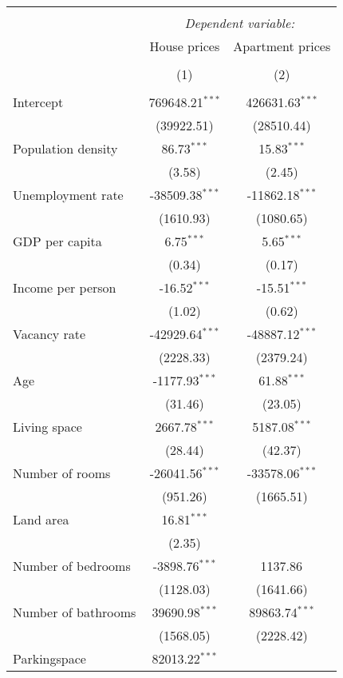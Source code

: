 \begin{table}[!htbp] \centering
\begin{tabular}{@{\extracolsep{5pt}}lcc}
\\[-1.8ex]\hline
\hline \\[-1.8ex]
& \multicolumn{2}{c}{\textit{Dependent variable:}} \
\cr \cline{2-3}
\\[-1.8ex] & \multicolumn{1}{c}{House prices} & \multicolumn{1}{c}{Apartment prices}  \\
\\[-1.8ex] & (1) & (2) \\
\hline \\[-1.8ex]
 Intercept & 769648.21$^{***}$ & 426631.63$^{***}$ \\
  & (39922.51) & (28510.44) \\
 Population density & 86.73$^{***}$ & 15.83$^{***}$ \\
  & (3.58) & (2.45) \\
 Unemployment rate & -38509.38$^{***}$ & -11862.18$^{***}$ \\
  & (1610.93) & (1080.65) \\
 GDP per capita & 6.75$^{***}$ & 5.65$^{***}$ \\
  & (0.34) & (0.17) \\
 Income per person & -16.52$^{***}$ & -15.51$^{***}$ \\
  & (1.02) & (0.62) \\
 Vacancy rate & -42929.64$^{***}$ & -48887.12$^{***}$ \\
  & (2228.33) & (2379.24) \\
 Age & -1177.93$^{***}$ & 61.88$^{***}$ \\
  & (31.46) & (23.05) \\
 Living space & 2667.78$^{***}$ & 5187.08$^{***}$ \\
  & (28.44) & (42.37) \\
 Number of rooms & -26041.56$^{***}$ & -33578.06$^{***}$ \\
  & (951.26) & (1665.51) \\
 Land area & 16.81$^{***}$ & \\
  & (2.35) & \\
 Number of bedrooms & -3898.76$^{***}$ & 1137.86$^{}$ \\
  & (1128.03) & (1641.66) \\
 Number of bathrooms & 39690.98$^{***}$ & 89863.74$^{***}$ \\
  & (1568.05) & (2228.42) \\
 Parkingspace & 82013.22$^{***}$ & \\

\end{tabular}
\end{table}
